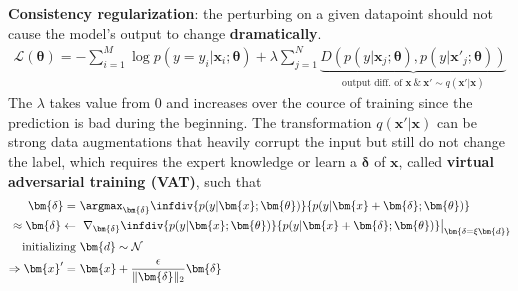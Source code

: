 \textbf{Consistency regularization}: the perturbing on a given datapoint should not cause the model's output to change \textbf{dramatically}.
\begin{gather}
    \mathcal{L}(\bm{\theta}) = -\sum_{i=1}^M\log p(y=y_i|\bm{x}_i;\bm{\theta}) + \lambda\sum_{j=1}^N\underbrace{D(p(y|\bm{x}_j;\bm{\theta}),p(y|\bm{x}'_j;\bm{\theta}))}_{\text{output diff. of }\bm{x}~\&~\bm{x}'\sim q(\bm{x}'|\bm{x})}
\end{gather}
The $\lambda$ takes value from 0 and increases over the cource of training since the prediction is bad during the beginning.
The transformation $q(\bm{x}'|\bm{x})$ can be strong data augmentations that heavily corrupt the input but still do not change the label,
which requires the expert knowledge or learn a $\bm{\delta}$ of $\bm{x}$, called \textbf{virtual adversarial training (VAT)}, such that
\begin{align}
    \bm{\delta}
    =&~\argmax_{\bm{\delta}}\infdiv{p(y|\bm{x};\bm{\theta})}{p(y|\bm{x}+\bm{\delta};\bm{\theta})} \\
    \approx
    \bm{\delta}
    \leftarrow&~\left.\nabla_{\bm{\delta}}\infdiv{p(y|\bm{x};\bm{\theta})}{p(y|\bm{x}+\bm{\delta};\bm{\theta})}\right|_{\bm{\delta=\xi\bm{d}}} \\
    \text{initializing}&~\bm{d}\sim\mathcal{N}\\
    \Rightarrow \bm{x}'
    =&~\bm{x}+\frac{\epsilon}{\|\bm{\delta}\|_2}\bm{\delta}
\end{align}

